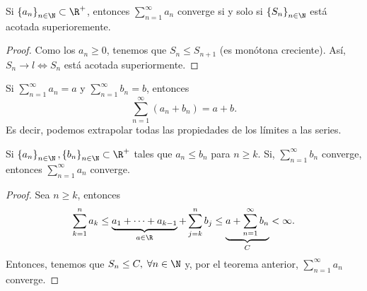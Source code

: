 \begin{ftheorem}[]
	\normalfont Si $\displaystyle \left\{ a_{n}\right\} _{n\in\N}\subset\R^{+} $, entonces $\displaystyle \sum^{\infty}_{n = 1}a_{n}  $ converge si y solo si $\displaystyle \left\{ S_{n}\right\} _{n\in\N} $ está acotada superioremente.
\end{ftheorem}

\begin{proof}
	Como los $\displaystyle a_{n} \geq 0 $, tenemos que $\displaystyle S_{n} \leq S_{n+1} $ (es monótona creciente). Así, $\displaystyle S_{n} \to l \iff S_{n} $ está acotada superiormente.
\end{proof}

\begin{observation}
\normalfont Si $\displaystyle \sum^{\infty}_{n = 1}a_{n} = a $ y $\displaystyle \sum^{\infty}_{n = 1}b_{n} = b $, entonces 
\[\sum^{\infty}_{n = 1}\left(a_{n}+b_{n}\right) = a + b .\]
Es decir, podemos extrapolar todas las propiedades de los límites a las series.
\end{observation}

\begin{ftheorem}
\normalfont Si $\displaystyle \left\{ a_{n}\right\} _{n\in\N}, \left\{ b_{n}\right\} _{n\in\N} \subset \R^{+} $ tales que $\displaystyle a_{n} \leq b_{n} $ para $\displaystyle n \geq k $. Si, $\displaystyle \sum^{\infty}_{n = 1} b_{n} $ converge, entonces $\displaystyle \sum^{\infty }_{n = 1}a_{n} $ converge.
\end{ftheorem}

\begin{proof}
Sea $\displaystyle n \geq k $, entonces
\[\sum^{n}_{k = 1}a_{k} \leq \underbrace{a_{1} + \cdots + a_{k-1}}_{a \in \R} + \sum^{n}_{j=k}b_{j} \leq \underbrace{a + \sum^{\infty}_{n = 1}b_{n}}_{C} < \infty .\]
Entonces, tenemos que $\displaystyle S_{n} \leq C, \; \forall n \in \N$ y, por el teorema anterior, $\displaystyle \sum^{\infty}_{n = 1}a_{n} $ converge. 
\end{proof}

